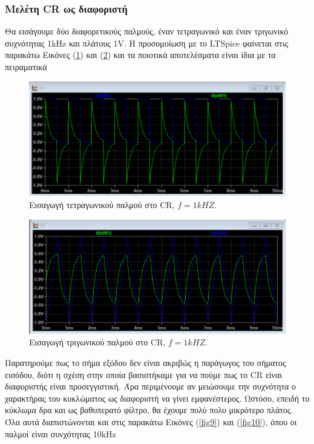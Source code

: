 \documentclass[a4paper]{article}
\begin{document}
\newpage	
		
	\subsubsection*{Μελέτη CR ως διαφοριστή}
		Θα εισάγουμε δύο διαφορετικούς παλμούς, έναν τετραγωνικό και έναν τριγωνικό συχνότητας 1kHz και πλάτους 1V. Η προσομοίωση με το LTSpice φαίνεται στις παρακάτω Εικόνες (\ref{fig7}) και (\ref{fig8}) και τα ποιοτικά αποτελέσματα είναι ίδια με τα πειραματικά 
			\begin{figure}[h!]
				\centering 
				\includegraphics[scale=0.4]{./figures/cr_rec.png}
				\caption{Εισαγωγή τετραγωνικού παλμού στο CR, $f=1kHZ$.}
				\label{fig7}
			\end{figure}
		
		\begin{figure}[h!]
			\centering 
			\includegraphics[scale=0.4]{./figures/cr_triag.png}
			\caption{Εισαγωγή τριγωνικού παλμού στο CR, $f=1kHZ$.}
			\label{fig8}
		\end{figure}
		
\newpage		
		
	Παρατηρούμε πως το σήμα εξόδου δεν είναι ακριβώς η παράγωγος του σήματος εισόδου, διότι η σχέση στην οποία βασιστήκαμε για να πούμε πως το CR είναι διαφοριστής είναι προσεγγιστική.	
	Άρα περιμένουμε αν μειώσουμε την συχνότητα ο χαρακτήρας του κυκλώματος ως διαφοριστή να γίνει εμφανέστερος. Ωστόσο, επειδή το κύκλωμα δρα και ως βαθυπερατό φίλτρο, θα έχουμε πολύ πολυ μικρότερο πλάτος. Όλα αυτά διαπιστώνονται και στις παρακάτω Εικόνες (\ref{fig9}) και (\ref{fig10}), όπου οι παλμοί είναι συνχότητας 10kHz
		
\end{document}

